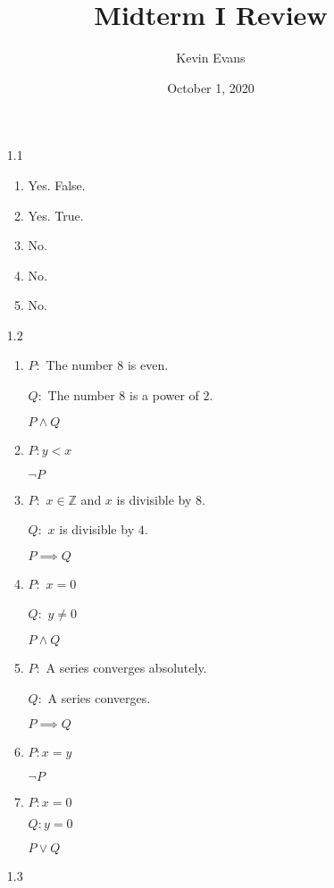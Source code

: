 \documentclass{homework}
\title{Midterm I Review}
\author{Kevin Evans}
\date{October 1, 2020}
\begin{document}
	\maketitle
	\begin{enumerate}
		\item[1.1] \begin{enumerate}
			\item Yes. False.
			\item Yes. True.
			\item No.
			\item No.
			\item No.
		\end{enumerate}
	
		\item[1.2] \begin{enumerate}
			\item $P: $ The number $8$ is even.
				
				$Q: $ The number $8$ is a power of $2$.
				
				$P \wedge Q$
				
			\item $P: y < x$
			
				$\neg P$
				
			\item $P: $ $x \in \mathbb{Z}$ and $x$ is divisible by $8$.
			
				$Q:$ $x$ is divisible by $4$.
				
				$P \implies Q$
				
			\item $P: $ $x = 0$
			
				$Q: $ $y \ne 0$
				
				$P \wedge Q$
				
			\item $P: $ A series converges absolutely.
			
				$Q: $ A series converges.
				
				$P \implies Q$
				
			\item $P: x = y$
			
				$\neg P$
				
			\item $P: x = 0$
			
				$Q: y = 0$
				
				$P \vee Q$
		\end{enumerate}
	
		\item[1.3] 
	\end{enumerate}
\end{document}
